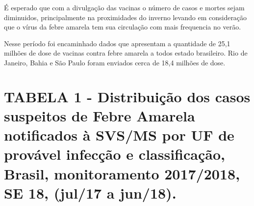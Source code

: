 \documentclass{article}
\begin{document}
\begin{multicols*}{2}
{    %
	É esperado que com a divulgação das vacinas o número de casos e mortes sejam diminuidos, principalmente na proximidades do inverno levando em consideração que o vírus da febre amarela tem sua circulação com mais frequencia no verão.
	
    Nesse período foi encaminhado dados que apresentam a quantidade de 25,1 milhões de dose de vacinas contra febre amarela a todos estado brasileiro. Rio de Janeiro, Bahia e São Paulo foram enviados cerca de 18,4 milhões de dose.
}%

\end{multicols*}



\newpage %




\justifying
	\section*{\large{TABELA 1 - Distribuição dos casos suspeitos de Febre Amarela notificados à SVS/MS por UF de provável infecção e classificação, Brasil, monitoramento 2017/2018, SE 18, (jul/17 a jun/18).}} %
 
 
 
\end{document}
